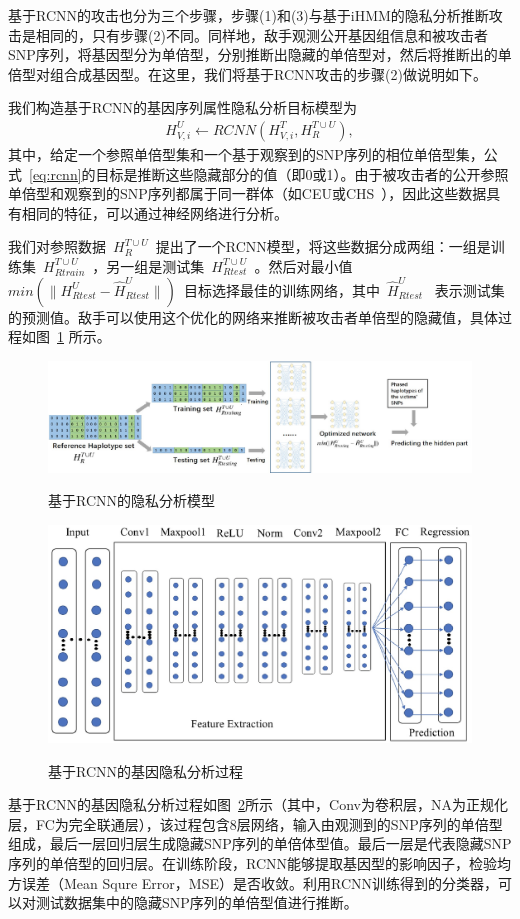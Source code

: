 基于RCNN的攻击也分为三个步骤，步骤(1)和(3)与基于iHMM的隐私分析推断攻击是相同的，只有步骤(2)不同。同样地，敌手观测公开基因组信息和被攻击者SNP序列，将基因型分为单倍型，分别推断出隐藏的单倍型对，然后将推断出的单倍型对组合成基因型。在这里，我们将基于RCNN攻击的步骤(2)做说明如下。

我们构造基于RCNN的基因序列属性隐私分析目标模型为
\begin{align}\label{eq:rcnn}
H_{V,i}^U  \leftarrow RCNN(H_{V,i}^T, H_R^{T \cup U}),
\end{align}
其中，给定一个参照单倍型集和一个基于观察到的SNP序列的相位单倍型集，公式~\ref{eq:rcnn}的目标是推断这些隐藏部分的值（即0或1）。由于被攻击者的公开参照单倍型和观察到的SNP序列都属于同一群体（如CEU或CHS~\cite{igsr2015which}），因此这些数据具有相同的特征，可以通过神经网络进行分析。

我们对参照数据~$H_R^{T \cup U}$~提出了一个RCNN模型，将这些数据分成两组：一组是训练集~$H_{Rtrain}^{T \cup U}$~，另一组是测试集~$H_{Rtest}^{T \cup U}$~。然后对最小值~$min(\|H_{Rtest}^{ U} - \hat{H}_{Rtest}^{U}\|)$~目标选择最佳的训练网络，其中~$\hat{H}_{Rtest}^{U}$~ 表示测试集的预测值。敌手可以使用这个优化的网络来推断被攻击者单倍型的隐藏值，具体过程如图~\ref{fig:rcnn_infer} 所示。

\begin{figure}[htbp]
	\centering
	\includegraphics[width=0.95\linewidth]{./figures/Fig3-RCNN-inference-attack.eps}\\
	\caption{基于RCNN的隐私分析模型}
	\label{fig:rcnn_infer}
\end{figure}


\begin{figure}[htbp]
	\centering
	\includegraphics[width=0.7\linewidth]{./figures/Fig4-RCNN-structure.eps}\\
	\caption{基于RCNN的基因隐私分析过程}
	\label{fig:RCNN}
\end{figure}
基于RCNN的基因隐私分析过程如图~\ref{fig:RCNN}所示（其中，Conv为卷积层，NA为正规化层，FC为完全联通层），该过程包含8层网络，输入由观测到的SNP序列的单倍型组成，最后一层回归层生成隐藏SNP序列的单倍体型值。最后一层是代表隐藏SNP序列的单倍型的回归层。在训练阶段，RCNN能够提取基因型的影响因子，检验均方误差（Mean Squre Error，MSE）是否收敛。利用RCNN训练得到的分类器，可以对测试数据集中的隐藏SNP序列的单倍型值进行推断。

